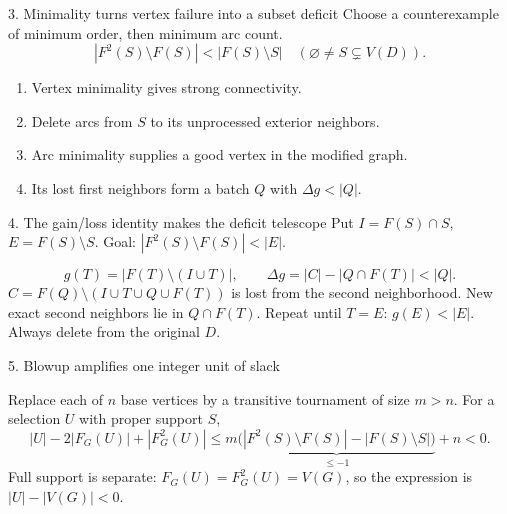 \documentclass[aspectratio=169,11pt]{beamer}
\begin{document}
\begin{frame}{3. Minimality turns vertex failure into a subset deficit}
Choose a counterexample of minimum order, then minimum arc count.
\[
|F^2(S)\setminus F(S)|<|F(S)\setminus S|
\quad(\varnothing\ne S\subsetneq V(D)).
\]
\begin{enumerate}
\item Vertex minimality gives strong connectivity.
\item Delete arcs from $S$ to its unprocessed exterior neighbors.
\item Arc minimality supplies a good vertex in the modified graph.
\item Its lost first neighbors form a batch $Q$ with $\Delta g<|Q|$.
\end{enumerate}
\end{frame}

\begin{frame}{4. The gain/loss identity makes the deficit telescope}
\small Put $I=F(S)\cap S$, $E=F(S)\setminus S$. Goal: $|F^2(S)\setminus F(S)|<|E|$.
\begin{center}\end{center}
\[
 g(T)=|F(T)\setminus(I\cup T)|,\qquad
 \Delta g=|C|-|Q\cap F(T)|<|Q|.
\]
\small
$C=F(Q)\setminus(I\cup T\cup Q\cup F(T))$ is lost from the second neighborhood.
New exact second neighbors lie in $Q\cap F(T)$.
\medskip
Repeat until $T=E$: $g(E)<|E|$. Always delete from the original $D$.
\end{frame}

\begin{frame}{5. Blowup amplifies one integer unit of slack}
\begin{center}\end{center}
\small
Replace each of $n$ base vertices by a transitive tournament of size $m>n$.
For a selection $U$ with proper support $S$,
\[
|U|-2|F_G(U)|+|F_G^2(U)|\le m\underbrace{\bigl(|F^2(S)\setminus F(S)|-|F(S)\setminus S|\bigr)}_{\le-1}+n<0.
\]
Full support is separate: $F_G(U)=F_G^2(U)=V(G)$, so the expression is $|U|-|V(G)|<0$.
\end{frame}
\end{document}
